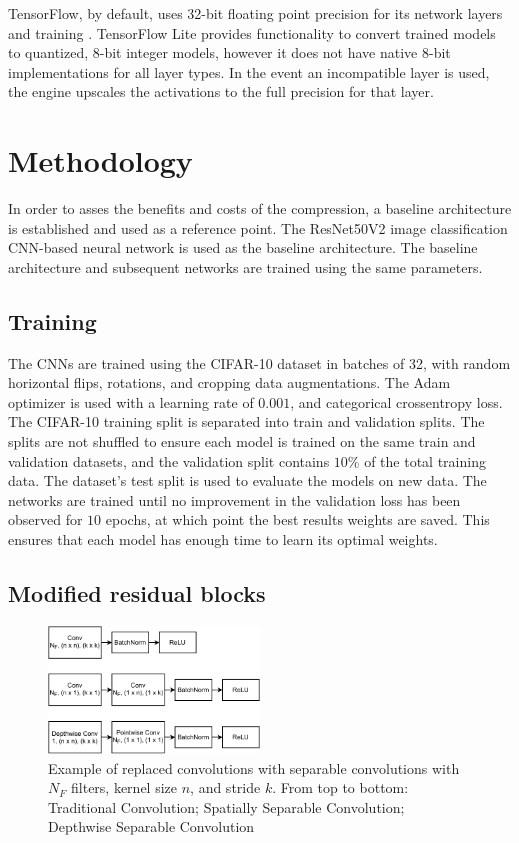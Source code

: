 \documentclass{article}
\begin{document}
	TensorFlow, by default, uses 32-bit floating point precision for its network layers and training \cite{tensorflow2015-whitepaper}. TensorFlow Lite provides functionality to convert trained models to quantized, 8-bit integer models, however it does not have native 8-bit implementations for all layer types. In the event an incompatible layer is used, the engine upscales the activations to the full precision for that layer.
	
	\section{Methodology}
	\label{sec:methodology}
	In order to asses the benefits and costs of the compression, a baseline architecture is established and used as a reference point. The ResNet50V2 image classification CNN-based neural network is used as the baseline architecture. The baseline architecture and subsequent networks are trained using the same parameters. 
	
	\subsection{Training}
	
	The CNNs are trained using the CIFAR-10 dataset \cite{cifar10} in batches of 32, with random horizontal flips, rotations, and cropping data augmentations. The Adam optimizer \cite{adam} is used with a learning rate of $0.001$, and categorical crossentropy loss. The CIFAR-10 training split is separated into train and validation splits. The splits are not shuffled to ensure each model is trained on the same train and validation datasets, and the validation split contains $10\%$ of the total training data. The dataset's test split is used to evaluate the models on new data. The networks are trained until no improvement in the validation loss has been observed for $10$ epochs, at which point the best results weights are saved. This ensures that each model has enough time to learn its optimal weights.
	
	\subsection{Modified residual blocks}
	
	\begin{figure}[h!]
		\centering
		\includegraphics[width=0.5\textwidth]{images/conv-structure.pdf}
		\caption{Example of replaced convolutions with separable convolutions with $N_F$ filters, kernel size $n$, and stride $k$. From top to bottom: Traditional Convolution; Spatially Separable Convolution; Depthwise Separable Convolution}
		\label{fig:conv-structure}
	\end{figure}
	
\end{document}
